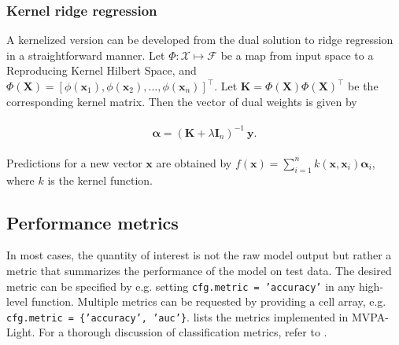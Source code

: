 \documentclass[utf8]{frontiersSCNS} %
\newcommand{\al}{\boldsymbol{\alpha}}
\newcommand{\x}{\mathbf{x}}
\newcommand{\y}{\mathbf{y}}
\newcommand{\I}{\mathbf{I}}
\newcommand{\K}{\mathbf{K}}
\newcommand{\X}{\mathbf{X}}
\newcommand{\ttt}[1]{\texttt{#1}}
\begin{document}
\subsubsection{Kernel ridge regression}

A kernelized version can be developed from the dual solution to ridge regression in a straightforward manner. Let $\Phi:\mathcal{X}\mapsto\mathcal{F}$ be a map from input space to a Reproducing Kernel Hilbert Space, and $\Phi(\X) = [\phi(\x_1),\phi(\x_2),...,\phi(\x_n)]^\top$. Let $\K = \Phi(\X)\Phi(\X)^\top$ be the corresponding kernel matrix. Then the vector of dual weights is given by  

\begin{align}
\begin{split}
\label{eq:kernel_ridge}
\al = (\K + \lambda\I_n)^{-1}\ \y.
\end{split}
\end{align}

Predictions for a new vector $\x$ are obtained by $f(\x) = \sum_{i=1}^n k(\x, \x_i)\al_i$, where $k$ is the kernel function.


\subsection{Performance metrics}\label{sec:metrics}

In most cases, the quantity of interest is not the raw model output but rather a metric that summarizes the performance of the model on test data. The desired metric can be specified by e.g. setting \ttt{cfg.metric = 'accuracy'} in any high-level function. Multiple metrics can be requested by providing a cell array, e.g. \ttt{cfg.metric = \{'accuracy', 'auc'\}}.  lists the metrics implemented in MVPA-Light. For a thorough discussion of classification metrics, refer to  \cite{Sokolova2009ATasks}.
\end{document}
